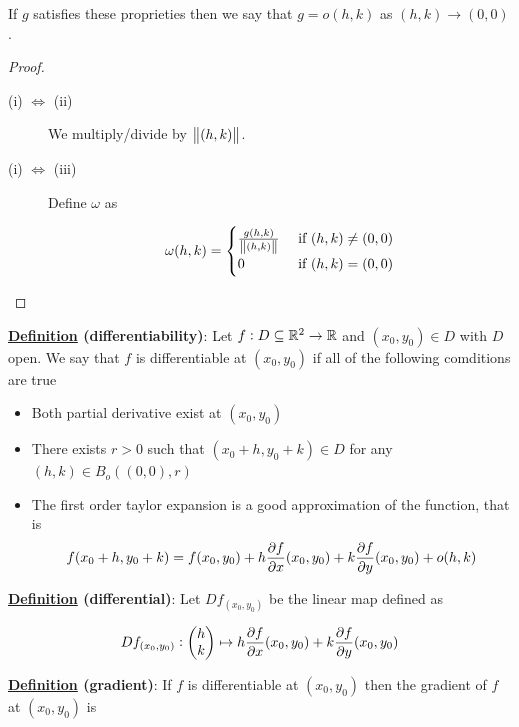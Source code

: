 \documentclass[10pt]{extarticle}
\begin{document}
If $g$ satisfies these proprieties then we say that $g = o(h,k)$ as $(h,k) \to (0,0)$.

\begin{proof}
    \skiplineafterproof
    \begin{description}
        \item[(i) $\iff$ (ii)]
            We multiply/divide by $\norm{(h,k)}$.

        \item[(i) $\iff$ (iii)]
            Define $\omega$ as

            $$
                \omega(h,k) = \begin{cases}
                    \frac{g(h,k)}{\norm{(h,k)}} & \text{ if } (h,k) \neq (0,0) \\
                    0                           & \text{ if } (h,k) = (0,0)
                \end{cases}
            $$
    \end{description}
\end{proof}

\textbf{\underline{Definition} (differentiability)}:
Let $f: D \subseteq \mathbb{R}^2 \to \mathbb{R}$ and $(x_0, y_0) \in D$ with $D$ open.
We say that $f$ is differentiable at $(x_0, y_0)$ if all of the following comditions are true
\begin{itemize}
    \item Both partial derivative exist at $(x_0, y_0)$
    \item There exists $r > 0$ such that $(x_0 + h, y_0 + k) \in D$ for any $(h, k) \in B_o \left((0,0), r\right)$
    \item The first order taylor expansion is a good approximation of the function, that is
          $$
              f(x_0 + h, y_0 + k) = f(x_0, y_0) + h \pdv{f}{x}()(x_0, y_0) + k \pdv{f}{y}()(x_0, y_0) + o(h, k)
          $$
\end{itemize}

\textbf{\underline{Definition} (differential)}:
Let $Df_{(x_0, y_0)}$ be the linear map defined as

$$
    Df_{(x_0, y_0)}: \begin{pmatrix}
        h \\ k
    \end{pmatrix}
    \mapsto h \pdv{f}{x}()(x_0, y_0) + k \pdv{f}{y}()(x_0, y_0)
$$

\textbf{\underline{Definition} (gradient)}:
If $f$ is differentiable at $(x_0, y_0)$ then the gradient of $f$ at $(x_0, y_0)$ is
\end{document}

